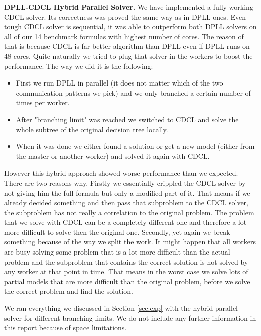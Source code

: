 \documentclass[letterpaper]{article}
\newcommand{\mypar}[1]{{\bf #1.}}
\begin{document}
\mypar{DPLL-CDCL Hybrid Parallel Solver}
We have implemented a fully working CDCL solver. Its correctness was proved the same way as in DPLL ones.
Even tough CDCL solver is sequential, it was able to outperform both DPLL solvers on all of our 14 benchmark formulas with highest number of cores.
The reason of that is because CDCL is far better algorithm than DPLL even if DPLL runs on 48 cores.
Quite naturally we tried to plug that solver in the workers to boost the performance.
The way we did it is the following:
\begin{itemize}
    \item First we run DPLL in parallel (it does not matter which of the two communication patterns we pick) and we only branched a certain number of times per worker.
    \item After "branching limit" was reached we switched to CDCL and solve the whole subtree of the original decision tree locally.
    \item When it was done we either found a solution or get a new model (either from the master or another worker) and solved it again with CDCL.
\end{itemize}
However this hybrid approach showed worse performance than we expected.
There are two reasons why.
Firstly we essentially crippled the CDCL solver by not giving him the full formula but only a modified part of it.
That means if we already decided something and then pass that subproblem to the CDCL solver, the subproblem has not really a correlation to the original problem.
The problem that we solve with CDCL can be a completely different one and therefore a lot more difficult to solve then the original one.
Secondly, yet again we break something because of the way we split the work.
It might happen that all workers are busy solving some problem that is a lot more difficult than the actual problem and the subproblem that contains the correct solution is not solved by any worker at that point in time.
That means in the worst case we solve lots of partial models that are more difficult than the original problem, before we solve the correct problem and find the solution.

We ran everything we discussed in Section \ref{sec:exp} with the hybrid parallel solver for different branching limits.
We do not include any further information in this report because of space limitations.
\end{document}

